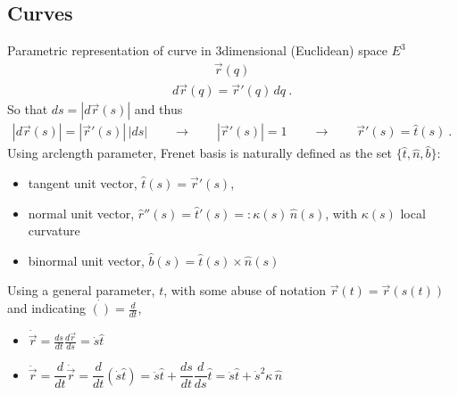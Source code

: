 \documentclass[letterpaper,10pt,english]{jupyterBook}
\begin{document}
\subsection{Curves}
\label{\detokenize{ch/differential-geometry/intro:curves}}
\sphinxAtStartPar
Parametric representation of curve in 3\sphinxhyphen{}dimensional (Euclidean) space \(E^3\)
\begin{equation*}
\begin{split}\vec{r}(q)\end{split}
\end{equation*}
\sphinxAtStartPar
{}
\begin{equation*}
\begin{split}d \vec{r}(q) = \vec{r}'(q) \, d q \ .\end{split}
\end{equation*}
\sphinxAtStartPar
{} So that \(d s = |d \vec{r}(s)|\) and thus
\begin{equation*}
\begin{split}|d \vec{r}(s)| = |\vec{r}'(s)| \, |d s| \qquad \rightarrow \qquad |\vec{r}'(s)| = 1 \qquad \rightarrow \qquad \vec{r}'(s) = \hat{t}(s) \ .\end{split}
\end{equation*}
\sphinxAtStartPar
{} Using arc\sphinxhyphen{}length parameter, Frenet basis is naturally defined as the set \(\{ \hat{t}, \hat{n}, \hat{b} \}\):
\begin{itemize}
\item {} 
\sphinxAtStartPar
tangent unit vector, \(\hat{t}(s) = \vec{r}'(s)\),

\item {} 
\sphinxAtStartPar
normal unit vector, \(\hat{r}''(s) = \hat{t}'(s) =: \kappa(s) \, \hat{n}(s) \), with \(\kappa(s)\) local curvature

\item {} 
\sphinxAtStartPar
binormal unit vector, \(\hat{b}(s) = \hat{t}(s) \times \hat{n}(s)\)

\end{itemize}

\sphinxAtStartPar
Using a general parameter, \(t\), with some abuse of notation \(\vec{r}(t) = \vec{r}(s(t))\) and indicating \(\dot{()} = \frac{d}{dt}\),
\begin{itemize}
\item {} 
\sphinxAtStartPar
\(\dot{\vec{r}} = \frac{d s}{d t} \frac{d \vec{r}}{d s} = \dot{s} \hat{t}\)

\item {} 
\sphinxAtStartPar
\(\ddot{\vec{r}} = \dfrac{d}{dt} \dot{\vec{r}} = \dfrac{d}{dt} \left( \dot{s} \hat{t} \right) = \ddot{s} \hat{t} + \dfrac{ds}{dt} \dfrac{d}{ds} \hat{t} = \ddot{s} \hat{t} + \dot{s}^2 \kappa \, \hat{n}\)

\end{itemize}
\end{document}

